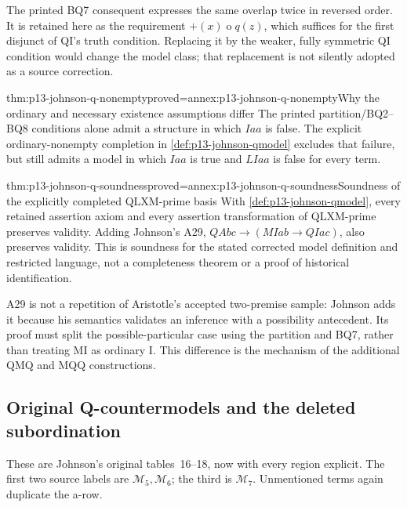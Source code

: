 The printed BQ7 consequent expresses the same overlap twice in reversed
order. It is retained here as the requirement \(+(x)\mathbin{o}q(z)\),
which suffices for the first disjunct of QI's truth condition. Replacing it
by the weaker, fully symmetric QI condition would change the model class;
that replacement is not silently adopted as a source correction.

\begin{hbtheorem}{thm:p13-johnson-q-nonempty}{proved=annex:p13-johnson-q-nonempty}{Why the ordinary and necessary existence assumptions differ}
The printed partition/BQ2--BQ8 conditions alone admit a structure in which
\(Iaa\) is false. The explicit ordinary-nonempty completion in
\cref{def:p13-johnson-qmodel} excludes that failure, but still admits a
model in which \(Iaa\) is true and \(LIaa\) is false for every term.
\end{hbtheorem}

\begin{hbtheorem}{thm:p13-johnson-q-soundness}{proved=annex:p13-johnson-q-soundness}{Soundness of the explicitly completed QLXM-prime basis}
With \cref{def:p13-johnson-qmodel}, every retained assertion axiom and every
assertion transformation of QLXM-prime preserves validity. Adding Johnson's
A29, \(QAbc\to(MIab\to QIac)\), also preserves validity.
This is soundness for the stated corrected model definition and restricted
language, not a completeness theorem or a proof of historical identification.
\end{hbtheorem}

A29 is not a repetition of Aristotle's accepted two-premise sample: Johnson
adds it because his semantics validates an inference with a possibility
antecedent. Its proof must split the possible-particular case using the
partition and BQ7, rather than treating MI as ordinary I. This difference is
the mechanism of the additional QMQ and MQQ constructions.

\subsection{Original Q-countermodels and the deleted subordination}
\label{sec:p13-johnson-q-countercases}

These are Johnson's original tables~16--18, now with every region explicit.
The first two source labels are \(\mathcal M_5,\mathcal M_6\); the third
is \(\mathcal M_7\). Unmentioned terms again duplicate the a-row.

